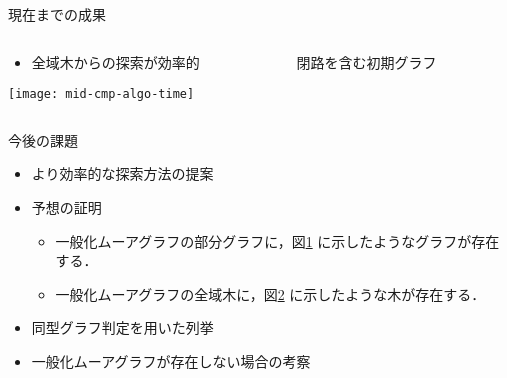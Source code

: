 \begin{frame}{現在までの成果}
  \begin{columns}
    \begin{column}{.6\textwidth}
      \centering
      \begin{itemize}
      \item 全域木からの探索が効率的
      \end{itemize}
      \texttt{[image: mid-cmp-algo-time]}
      \label{fig:result}
    \end{column}
    \begin{column}{.4\textwidth}
      \centering
      \begin{figure}
        \centering
        \def\svgwidth{\textwidth}
        \resizebox{!}{.3\textheight}{
          
        }
        \caption{閉路を含む初期グラフ}
        \label{fig:initial-graph-cycle}
      \end{figure}
      \vspace{-2em}
      \begin{figure}
        \def\svgwidth{\textwidth}
        \resizebox{!}{.3\textheight}{
          
        }
        \label{fig:initial-graph-stree}
      \end{figure}
    \end{column}
  \end{columns}
\end{frame}

\begin{frame}{今後の課題}
  \begin{itemize}
  \item より効率的な探索方法の提案
  \item 予想の証明
    \begin{itemize}
    \item 一般化ムーアグラフの部分グラフに，図\ref{fig:initial-graph-cycle}
      に示したようなグラフが存在する．
    \item 一般化ムーアグラフの全域木に，図\ref{fig:initial-graph-stree}
      に示したような木が存在する．
    \end{itemize}
  \item 同型グラフ判定を用いた列挙
  \item 一般化ムーアグラフが存在しない場合の考察
  \end{itemize}
\end{frame}

